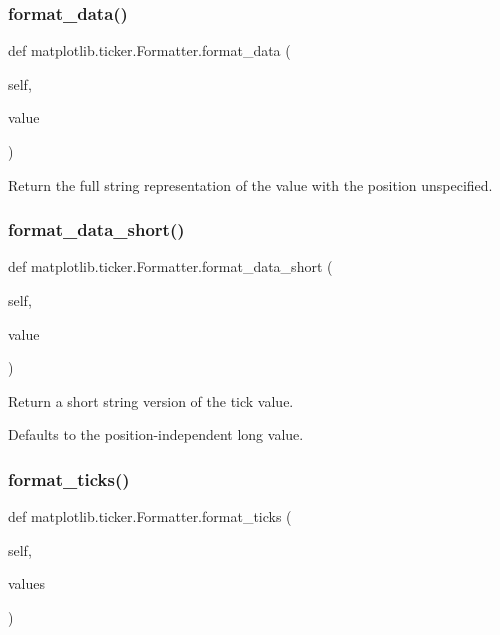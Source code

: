 \subsubsection{\texorpdfstring{format\+\_\+data()}{format\_data()}}
{\footnotesize\ttfamily def matplotlib.\+ticker.\+Formatter.\+format\+\_\+data (\begin{DoxyParamCaption}\item[{}]{self,  }\item[{}]{value }\end{DoxyParamCaption})}

\begin{DoxyVerb}Return the full string representation of the value with the
position unspecified.
\end{DoxyVerb}
 \mbox{\label{classmatplotlib_1_1ticker_1_1Formatter_a7f685100c7b0f7368c4831b07138ed64}} 
\subsubsection{\texorpdfstring{format\+\_\+data\+\_\+short()}{format\_data\_short()}}
{\footnotesize\ttfamily def matplotlib.\+ticker.\+Formatter.\+format\+\_\+data\+\_\+short (\begin{DoxyParamCaption}\item[{}]{self,  }\item[{}]{value }\end{DoxyParamCaption})}

\begin{DoxyVerb}Return a short string version of the tick value.

Defaults to the position-independent long value.
\end{DoxyVerb}
 \mbox{\label{classmatplotlib_1_1ticker_1_1Formatter_aa5199a3212bebba98fb2d0f3bea28cbd}} 
\subsubsection{\texorpdfstring{format\+\_\+ticks()}{format\_ticks()}}
{\footnotesize\ttfamily def matplotlib.\+ticker.\+Formatter.\+format\+\_\+ticks (\begin{DoxyParamCaption}\item[{}]{self,  }\item[{}]{values }\end{DoxyParamCaption})}

